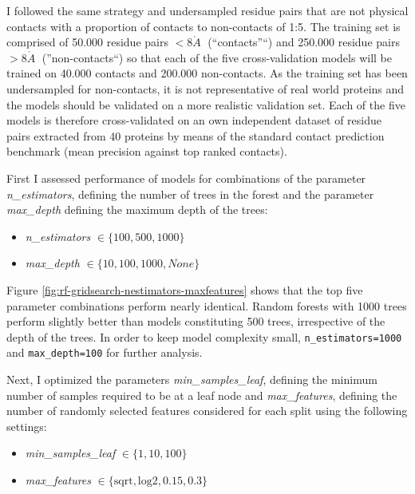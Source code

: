 \documentclass[12pt,a4paper,twoside]{book}
\providecommand{\tightlist}{%
  \setlength{\itemsep}{0pt}\setlength{\parskip}{0pt}}
\newcommand{\angstrom}{\mathring{A} \;}
\theoremstyle{definition}
\theoremstyle{definition}
\theoremstyle{remark}
\begin{document}
I followed the same strategy and undersampled residue pairs that are not
physical contacts with a proportion of contacts to non-contacts of 1:5.
The training set is comprised of 50.000 residue pairs \(< 8 \angstrom\)
(``contacts''``) and 250.000 residue pairs \(> 8 \angstrom\)
(''non-contacts``) so that each of the five cross-validation models will
be trained on 40.000 contacts and 200.000 non-contacts. As the training
set has been undersampled for non-contacts, it is not representative of
real world proteins and the models should be validated on a more
realistic validation set. Each of the five models is therefore
cross-validated on an own independent dataset of residue pairs extracted
from 40 proteins by means of the standard contact prediction benchmark
(mean precision against top ranked contacts).

\pagebreak

First I assessed performance of models for combinations of the parameter
\emph{n\_estimators}, defining the number of trees in the forest and the
parameter \emph{max\_depth} defining the maximum depth of the trees:

\begin{itemize}
\tightlist
\item
  \emph{n\_estimators} \(\in \{100,500,1000\}\)
\item
  \emph{max\_depth} \(\in \{10, 100, 1000, None\}\)
\end{itemize}

Figure \ref{fig:rf-gridsearch-nestimators-maxfeatures} shows that the
top five parameter combinations perform nearly identical. Random forests
with 1000 trees perform slightly better than models constituting 500
trees, irrespective of the depth of the trees. In order to keep model
complexity small, \texttt{n\_estimators=1000} and
\texttt{max\_depth=100} for further analysis.

Next, I optimized the parameters \emph{min\_samples\_leaf}, defining the
minimum number of samples required to be at a leaf node and
\emph{max\_features}, defining the number of randomly selected features
considered for each split using the following settings:

\begin{itemize}
\tightlist
\item
  \emph{min\_samples\_leaf} \(\in \{1, 10, 100\}\)
\item
  \emph{max\_features} \(\in \{\text{sqrt}, \text{log2}, 0.15, 0.3\}\)
\end{itemize}
\end{document}
